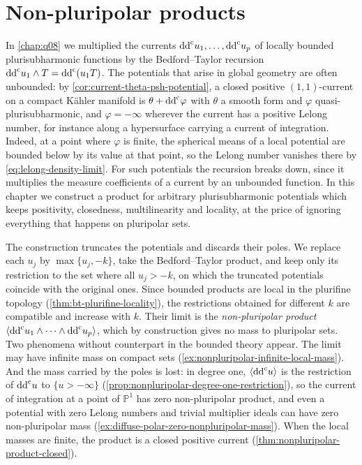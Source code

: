 \chapter{Non-pluripolar products}
\label{chap:q09}

In \cref{chap:q08} we multiplied the currents $\mathrm{dd}^{\mathrm{c}} u_1,\ldots,\mathrm{dd}^{\mathrm{c}} u_p$ of locally bounded plurisubharmonic functions by the Bedford--Taylor recursion $\mathrm{dd}^{\mathrm{c}} u_1\wedge T=\mathrm{dd}^{\mathrm{c}}(u_1T)$. The potentials that arise in global geometry are often unbounded: by \cref{cor:current-theta-psh-potential}, a closed positive $(1,1)$-current on a compact K\"ahler manifold is $\theta+\mathrm{dd}^{\mathrm{c}}\varphi$ with $\theta$ a smooth form and $\varphi$ quasi-plurisubharmonic, and $\varphi=-\infty$ wherever the current has a positive Lelong number, for instance along a hypersurface carrying a current of integration. Indeed, at a point where $\varphi$ is finite, the spherical means of a local potential are bounded below by its value at that point, so the Lelong number vanishes there by \eqref{eq:lelong-density-limit}. For such potentials the recursion breaks down, since it multiplies the measure coefficients of a current by an unbounded function. In this chapter we construct a product for arbitrary plurisubharmonic potentials which keeps positivity, closedness, multilinearity and locality, at the price of ignoring everything that happens on pluripolar sets.

The construction truncates the potentials and discards their poles. We replace each $u_j$ by $\max\{u_j,-k\}$, take the Bedford--Taylor product, and keep only its restriction to the set where all $u_j>-k$, on which the truncated potentials coincide with the original ones. Since bounded products are local in the plurifine topology (\cref{thm:bt-plurifine-locality}), the restrictions obtained for different $k$ are compatible and increase with $k$. Their limit is the \emph{non-pluripolar product} $\langle\mathrm{dd}^{\mathrm{c}} u_1\wedge\cdots\wedge\mathrm{dd}^{\mathrm{c}} u_p\rangle$, which by construction gives no mass to pluripolar sets. Two phenomena without counterpart in the bounded theory appear. The limit may have infinite mass on compact sets (\cref{ex:nonpluripolar-infinite-local-mass}). And the mass carried by the poles is lost: in degree one, $\langle\mathrm{dd}^{\mathrm{c}} u\rangle$ is the restriction of $\mathrm{dd}^{\mathrm{c}} u$ to $\{u>-\infty\}$ (\cref{prop:nonpluripolar-degree-one-restriction}), so the current of integration at a point of $\mathbb P^1$ has zero non-pluripolar product, and even a potential with zero Lelong numbers and trivial multiplier ideals can have zero non-pluripolar mass (\cref{ex:diffuse-polar-zero-nonpluripolar-mass}). When the local masses are finite, the product is a closed positive current (\cref{thm:nonpluripolar-product-closed}).

